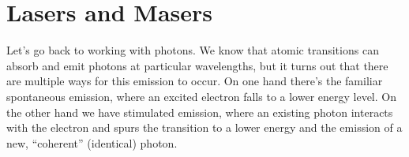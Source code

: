 \documentclass[../p052main.tex]{subfiles}
\begin{document}

\section{Lasers and Masers}
Let's go back to working with photons.
We know that atomic transitions can absorb and emit photons at particular wavelengths, but it turns out that there are multiple ways for this emission to occur.
On one hand there's the familiar spontaneous emission, where an excited electron falls to a lower energy level.
On the other hand we have stimulated emission, where an existing photon interacts with the electron and spurs the transition to a lower energy and the emission of a new, ``coherent'' (identical) photon.
\end{document}
